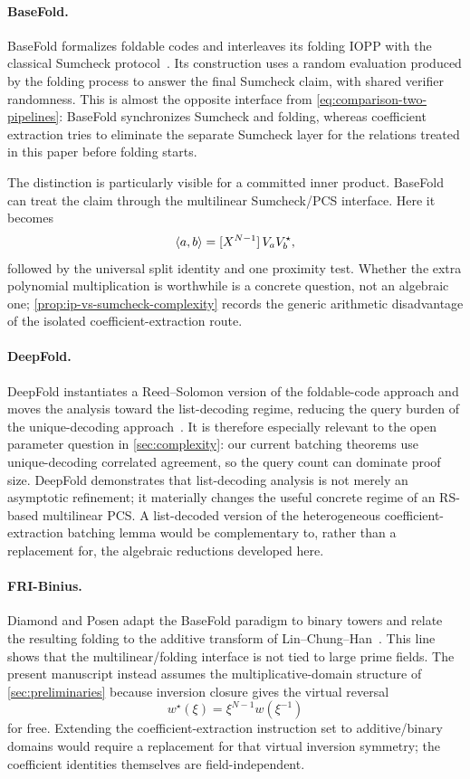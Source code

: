 \paragraph{BaseFold.}
BaseFold formalizes foldable codes and interleaves its folding IOPP with the classical Sumcheck protocol~\cite{BaseFold24}.  Its construction uses a random evaluation produced by the folding process to answer the final Sumcheck claim, with shared verifier randomness.  This is almost the opposite interface from \eqref{eq:comparison-two-pipelines}: BaseFold synchronizes Sumcheck and folding, whereas coefficient extraction tries to eliminate the separate Sumcheck layer for the relations treated in this paper before folding starts.

The distinction is particularly visible for a committed inner product.  BaseFold can treat the claim through the multilinear Sumcheck/PCS interface.  Here it becomes
\[
  \left\langle a,b\right\rangle
  =[X^{N-1}]\,V_aV_b^\star,
\]
followed by the universal split identity and one proximity test.  Whether the extra polynomial multiplication is worthwhile is a concrete question, not an algebraic one; \cref{prop:ip-vs-sumcheck-complexity} records the generic arithmetic disadvantage of the isolated coefficient-extraction route.

\paragraph{DeepFold.}
DeepFold instantiates a Reed--Solomon version of the foldable-code approach and moves the analysis toward the list-decoding regime, reducing the query burden of the unique-decoding approach~\cite{DeepFold25}.  It is therefore especially relevant to the open parameter question in \cref{sec:complexity}: our current batching theorems use unique-decoding correlated agreement, so the query count can dominate proof size.  DeepFold demonstrates that list-decoding analysis is not merely an asymptotic refinement; it materially changes the useful concrete regime of an RS-based multilinear PCS.  A list-decoded version of the heterogeneous coefficient-extraction batching lemma would be complementary to, rather than a replacement for, the algebraic reductions developed here.

\paragraph{FRI-Binius.}
Diamond and Posen adapt the BaseFold paradigm to binary towers and relate the resulting folding to the additive transform of Lin--Chung--Han~\cite{FRIBinius24}.  This line shows that the multilinear/folding interface is not tied to large prime fields.  The present manuscript instead assumes the multiplicative-domain structure of \cref{sec:preliminaries} because inversion closure gives the virtual reversal
\[
  w^\star(\xi)=\xi^{N-1}w(\xi^{-1})
\]
for free.  Extending the coefficient-extraction instruction set to additive/binary domains would require a replacement for that virtual inversion symmetry; the coefficient identities themselves are field-independent.

